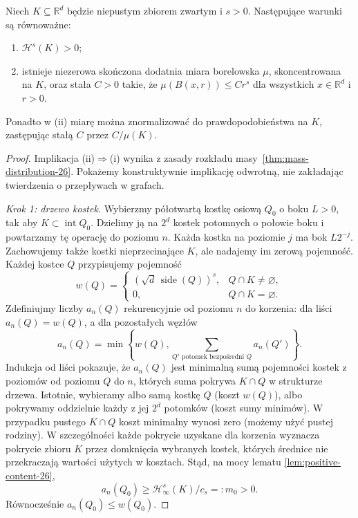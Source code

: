 \begin{twierdzenie}
\label{thm:frostman-26}
Niech $K\subseteq\mathbb R^d$ będzie niepustym
zbiorem zwartym i $s>0$. Następujące warunki
są równoważne:
\begin{enumerate}[label=(\roman*)]
 \item $\mathcal H^s(K)>0$;
 \item istnieje niezerowa skończona dodatnia miara
 borelowska $\mu$, skoncentrowana na $K$, oraz stała
 $C>0$ takie, że
 $\mu(B(x,r))\le Cr^s$ dla wszystkich
 $x\in\mathbb R^d$ i $r>0$.
\end{enumerate}
Ponadto w (ii) miarę można znormalizować do
prawdopodobieństwa na $K$, zastępując stałą $C$
przez $C/\mu(K)$.
\end{twierdzenie}
\begin{proof}
Implikacja (ii)$\Rightarrow$(i) wynika z zasady
rozkładu masy~\ref{thm:mass-distribution-26}.
Pokażemy konstruktywnie implikację odwrotną, nie
zakładając twierdzenia o przepływach w grafach.

\emph{Krok 1: drzewo kostek.} Wybierzmy półotwartą
kostkę osiową $Q_0$ o boku $L>0$, tak aby
$K\subset\operatorname{int}Q_0$. Dzielimy ją na
$2^d$ kostek potomnych o połowie boku i powtarzamy
tę operację do poziomu $n$. Każda kostka na poziomie
$j$ ma bok $L2^{-j}$. Zachowujemy także kostki
nieprzecinające $K$, ale nadajemy im zerową pojemność.
Każdej kostce $Q$ przypisujemy pojemność
\[
 w(Q)=\begin{cases}
 (\sqrt d\,\operatorname{side}(Q))^s,&Q\cap K\ne\varnothing,\\
 0,&Q\cap K=\varnothing.
 \end{cases}
\]
Zdefiniujmy liczby $a_n(Q)$ rekurencyjnie od poziomu
$n$ do korzenia: dla liści $a_n(Q)=w(Q)$, a dla
pozostałych węzłów
\begin{equation}\label{eq:frostman-recursion-26}
 a_n(Q)=\min\left\{w(Q),\sum_{Q'\text{ potomek bezpośredni }Q}
 a_n(Q')\right\}.
\end{equation}
Indukcja od liści pokazuje, że $a_n(Q)$ jest minimalną
sumą pojemności kostek z poziomów od poziomu $Q$
do $n$, których suma pokrywa $K\cap Q$ w strukturze
drzewa. Istotnie, wybieramy albo samą kostkę $Q$
(koszt $w(Q)$), albo pokrywamy oddzielnie każdy z jej
$2^d$ potomków (koszt sumy minimów). W przypadku pustego $K\cap Q$ koszt minimalny
wynosi zero (możemy użyć pustej rodziny).
W szczególności każde pokrycie uzyskane dla korzenia
wyznacza pokrycie zbioru $K$ przez domknięcia
wybranych kostek, których średnice nie przekraczają
wartości użytych w kosztach. Stąd, na mocy lematu
\ref{lem:positive-content-26},
\begin{equation}\label{eq:frostman-positive-26}
 a_n(Q_0)\ge\mathcal H^s_\infty(K)/c_s=:m_0>0.
\end{equation}
Równocześnie $a_n(Q_0)\le w(Q_0)$.


\end{proof}
